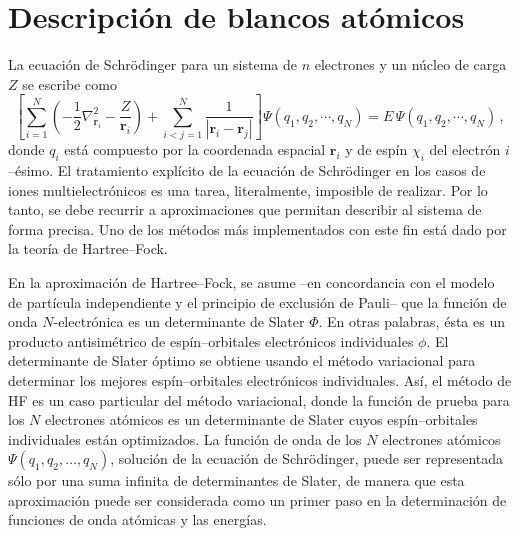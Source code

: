 \begin{comment}
\end{comment}

\section{Descripción de blancos atómicos}
\label{sec:atomos}

La ecuación de Schrödinger para un sistema de $n$ electrones y 
un núcleo de carga $Z$ se escribe como
\begin{equation}
\left[
\sum_{i=1}^N \left(-\frac{1}{2}\nabla^2_{{\mathbf r}_i}
                   -\frac{Z}{{\mathbf r}_i}\right) + 
\sum_{i<j=1}^N \frac{1}{|{\mathbf r}_i - {\mathbf r}_j |} 
\right] \Psi\left(q_1,q_2,\cdots,q_N\right) 
= E\, \Psi\left(q_1,q_2,\cdots,q_N\right) 
\, ,
\end{equation}
donde $q_i$ está compuesto por la coordenada espacial $\mathbf{r}_i$ y 
de espín $\chi_i$ del electrón $i$--ésimo. El tratamiento explícito de 
la ecuación de Schr\"odinger en los casos de iones multielectrónicos es 
una tarea, literalmente, imposible de realizar. Por lo tanto, se debe 
recurrir a aproximaciones que permitan describir al sistema de forma 
precisa. Uno de los métodos más implementados con este fin está dado por 
la teoría de Hartree--Fock. 

En la aproximación de Hartree--Fock, se asume --en concordancia con el 
modelo de partícula independiente y el principio de exclusión de Pauli-- 
que la función de onda $N$-electrónica es un determinante de Slater 
$\Phi$. En otras palabras, ésta es un producto antisimétrico de 
espín--orbitales electrónicos individuales $\phi$. El determinante de 
Slater óptimo se obtiene usando el método variacional para determinar 
los mejores espín--orbitales electrónicos individuales. Así, el método 
de HF es un caso particular del método variacional, donde la función de 
prueba para los $N$ electrones atómicos es un determinante de Slater 
cuyos espín--orbitales individuales están optimizados. La función de 
onda de los $N$ electrones atómicos $\Psi(q_1,q_2,\dots,q_N)$, solución 
de la ecuación de Schrödinger, puede ser representada sólo por una suma 
infinita de determinantes de Slater, de manera que esta aproximación 
puede ser considerada como un primer paso en la determinación de 
funciones de onda atómicas y las energías. 

